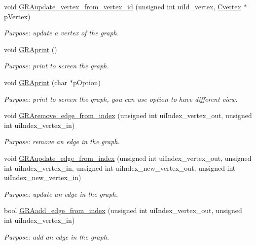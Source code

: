 \begin{DoxyCompactItemize}
void \hyperlink{class_cgraph_a902a9ad6561b0f4d5683a4778377461b}{G\+R\+Aupdate\+\_\+vertex\+\_\+from\+\_\+vertex\+\_\+id} (unsigned int ui\+Id\+\_\+vertex, \hyperlink{class_cvertex}{Cvertex} $\ast$p\+Vertex)
\begin{DoxyCompactList}\small\item\em Purpose\+: update a vertex of the graph. \end{DoxyCompactList}\item 
void \hyperlink{class_cgraph_a43c280add746a2aee6d6c09435d8da00}{G\+R\+Aprint} ()
\begin{DoxyCompactList}\small\item\em Purpose\+: print to screen the graph. \end{DoxyCompactList}\item 
void \hyperlink{class_cgraph_ac0f9c28d05f4ce98521d2a859fd5f540}{G\+R\+Aprint} (char $\ast$p\+Option)
\begin{DoxyCompactList}\small\item\em Purpose\+: print to screen the graph, you can use option to have different view. \end{DoxyCompactList}\item 
void \hyperlink{class_cgraph_a0be43dbf3a34b9ed7161dd11d81ba9a3}{G\+R\+Aremove\+\_\+edge\+\_\+from\+\_\+index} (unsigned int ui\+Index\+\_\+vertex\+\_\+out, unsigned int ui\+Index\+\_\+vertex\+\_\+in)
\begin{DoxyCompactList}\small\item\em Purpose\+: remove an edge in the graph. \end{DoxyCompactList}\item 
void \hyperlink{class_cgraph_a399bfe930e7d73dff66fd9cc7321b8ba}{G\+R\+Aupdate\+\_\+edge\+\_\+from\+\_\+index} (unsigned int ui\+Index\+\_\+vertex\+\_\+out, unsigned int ui\+Index\+\_\+vertex\+\_\+in, unsigned int ui\+Index\+\_\+new\+\_\+vertex\+\_\+out, unsigned int ui\+Index\+\_\+new\+\_\+vertex\+\_\+in)
\begin{DoxyCompactList}\small\item\em Purpose\+: update an edge in the graph. \end{DoxyCompactList}\item 
bool \hyperlink{class_cgraph_a1154ecf975f57d2eecf7dbcabe850abf}{G\+R\+Aadd\+\_\+edge\+\_\+from\+\_\+index} (unsigned int ui\+Index\+\_\+vertex\+\_\+out, unsigned int ui\+Index\+\_\+vertex\+\_\+in)
\begin{DoxyCompactList}\small\item\em Purpose\+: add an edge in the graph. \end{DoxyCompactList}\item 

\end{DoxyCompactItemize}
